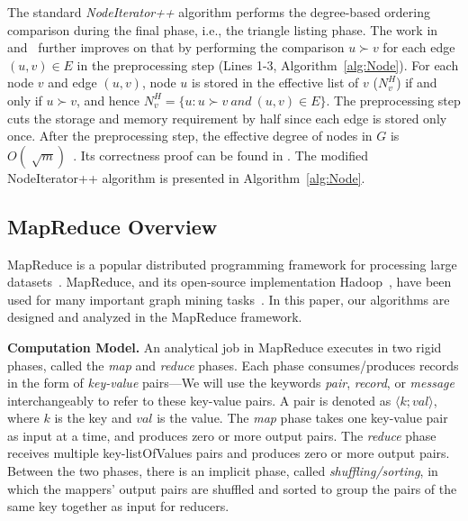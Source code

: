 The standard \emph{NodeIterator++} algorithm performs the degree-based ordering comparison during the final phase, i.e., the triangle listing phase. 
The work in~\cite{Patric} and~\cite{Suri_Vassilvitskii_2011} further improves on that by performing the comparison $u \succ v$ for each edge $(u,v) \in E$ 
in the preprocessing step (Lines 1-3, Algorithm~\ref{alg:Node}). For each node $v$ and edge $(u,v)$, node $u$ is stored in the effective list of $v$ ($N_v^H$) 
if and only if $u \succ v$, and hence $N_{v}^H=\lbrace u: u\succ v ~and~ (u,v) \in E \rbrace$. 
The preprocessing step cuts the storage and memory requirement by half since each edge is stored only once. After the preprocessing step, the effective degree of nodes in $G$ is $O(\sqrt[]{m})$~\cite{Schank_2007}. Its correctness proof can be found in \cite{Patric}.
The modified NodeIterator++ algorithm is presented in Algorithm~\ref{alg:Node}. 

\subsection{MapReduce Overview}
MapReduce is a popular distributed programming framework for processing large datasets~\cite{MapReduceGoogle}. 
MapReduce, and its open-source implementation Hadoop~\cite{whitehadoop_2010}, have been used for many important 
graph mining tasks~\cite{Suri_Vassilvitskii_2011,parkmapreduce2014}. 
In this paper, our algorithms are designed and analyzed in the MapReduce framework. 

\textbf{Computation Model.} An analytical  job in MapReduce executes in two rigid phases, called the {\em map} and {\em reduce} phases. Each phase consumes/produces records in the form of {\em key-value} pairs---We will use the keywords {\em pair}, {\em record}, or {\em message} interchangeably to refer to these key-value pairs. 
A pair is denoted as $\langle k;val \rangle $, where $k$ is the key and $val$ is the value. 
The {\em map} phase takes one key-value pair as input at a time, and produces zero or more output pairs. 
The {\em reduce} phase receives multiple key-listOfValues pairs and produces zero or more output pairs. 
Between the two phases, there is an implicit phase, called {\em shuffling/sorting}, in which the mappers' output pairs are 
 shuffled and sorted to group the pairs of the same key together as input for reducers. 


